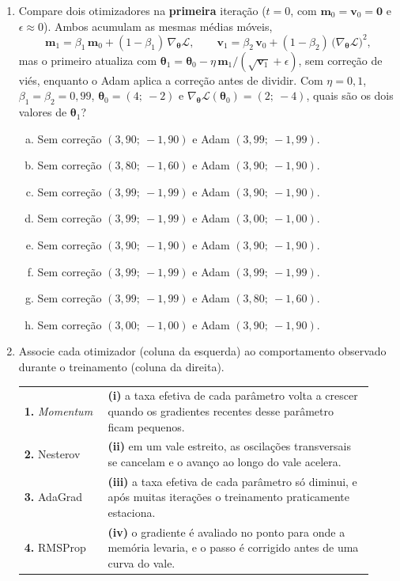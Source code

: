 \documentclass{dlproblemset}
\begin{document}
\begin{enumerate}[1)]
    \item Compare dois otimizadores na \textbf{primeira} iteração ($t = 0$, com $\mathbf{m}_0 = \mathbf{v}_0 = \mathbf{0}$ e $\epsilon \approx 0$). Ambos acumulam as mesmas médias móveis,
    \[
    \mathbf{m}_{1} = \beta_1\,\mathbf{m}_{0} + (1 - \beta_1)\,\nabla_{\boldsymbol{\theta}}\mathcal{L}, \qquad
    \mathbf{v}_{1} = \beta_2\,\mathbf{v}_{0} + (1 - \beta_2)\,\bigl(\nabla_{\boldsymbol{\theta}}\mathcal{L}\bigr)^{2} ,
    \]
    mas o primeiro atualiza com $\boldsymbol{\theta}_{1} = \boldsymbol{\theta}_{0} - \eta\,\mathbf{m}_{1} / (\sqrt{\mathbf{v}_{1}} + \epsilon)$, sem correção de viés, enquanto o Adam aplica a correção antes de dividir. Com $\eta = 0{,}1$, $\beta_1 = \beta_2 = 0{,}99$, $\boldsymbol{\theta}_0 = (4;\ -2)$ e $\nabla_{\boldsymbol{\theta}}\mathcal{L}(\boldsymbol{\theta}_0) = (2;\ -4)$, quais são os dois valores de $\boldsymbol{\theta}_1$?
    \begin{enumerate}[(a)]
        \item Sem correção $(3{,}90;\ -1{,}90)$ e Adam $(3{,}99;\ -1{,}99)$.
        \item Sem correção $(3{,}80;\ -1{,}60)$ e Adam $(3{,}90;\ -1{,}90)$.
        \item Sem correção $(3{,}99;\ -1{,}99)$ e Adam $(3{,}90;\ -1{,}90)$.
        \item Sem correção $(3{,}99;\ -1{,}99)$ e Adam $(3{,}00;\ -1{,}00)$.
        \item Sem correção $(3{,}90;\ -1{,}90)$ e Adam $(3{,}90;\ -1{,}90)$.
        \item Sem correção $(3{,}99;\ -1{,}99)$ e Adam $(3{,}99;\ -1{,}99)$.
        \item Sem correção $(3{,}99;\ -1{,}99)$ e Adam $(3{,}80;\ -1{,}60)$.
        \item Sem correção $(3{,}00;\ -1{,}00)$ e Adam $(3{,}90;\ -1{,}90)$.
    \end{enumerate}

    \item Associe cada otimizador (coluna da esquerda) ao comportamento observado durante o treinamento (coluna da direita).

    \begin{center}
    \begin{tabular}{p{0.22\linewidth} p{0.70\linewidth}}
    \textbf{1.} \textit{Momentum} & \textbf{(i)} a taxa efetiva de cada parâmetro volta a crescer quando os gradientes recentes desse parâmetro ficam pequenos. \\
    \textbf{2.} Nesterov & \textbf{(ii)} em um vale estreito, as oscilações transversais se cancelam e o avanço ao longo do vale acelera. \\
    \textbf{3.} AdaGrad & \textbf{(iii)} a taxa efetiva de cada parâmetro só diminui, e após muitas iterações o treinamento praticamente estaciona. \\
    \textbf{4.} RMSProp & \textbf{(iv)} o gradiente é avaliado no ponto para onde a memória levaria, e o passo é corrigido antes de uma curva do vale. \\
    \end{tabular}
    \end{center}


\end{enumerate}
\end{document}
